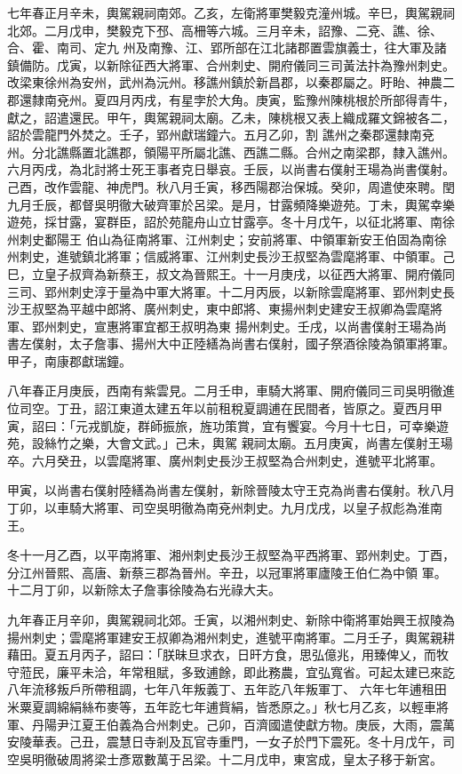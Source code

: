 \begin{pinyinscope}
 七年春正月辛未，輿駕親祠南郊。乙亥，左衛將軍樊毅克潼州城。辛巳，輿駕親祠北郊。二月戊申，樊毅克下邳、高柵等六城。三月辛未，詔豫、二兗、譙、徐、合、霍、南司、定九
 州及南豫、江、郢所部在江北諸郡置雲旗義士，往大軍及諸鎮備防。戊寅，以新除征西大將軍、合州刺史、開府儀同三司黃法抃為豫州刺史。改梁東徐州為安州，武州為沅州。移譙州鎮於新昌郡，以秦郡屬之。盱眙、神農二郡還隸南兗州。夏四月丙戌，有星孛於大角。庚寅，監豫州陳桃根於所部得青牛，獻之，詔遣還民。甲午，輿駕親祠太廟。乙未，陳桃根又表上織成羅文錦被各二，詔於雲龍門外焚之。壬子，郢州獻瑞鐘六。五月乙卯，割
 譙州之秦郡還隸南兗州。分北譙縣置北譙郡，領陽平所屬北譙、西譙二縣。合州之南梁郡，隸入譙州。六月丙戌，為北討將士死王事者克日舉哀。壬辰，以尚書右僕射王瑒為尚書僕射。己酉，改作雲龍、神虎門。秋八月壬寅，移西陽郡治保城。癸卯，周遣使來聘。閏九月壬辰，都督吳明徹大破齊軍於呂梁。是月，甘露頻降樂遊苑。丁未，輿駕幸樂遊苑，採甘露，宴群臣，詔於苑龍舟山立甘露亭。冬十月戊午，以征北將軍、南徐州刺史鄱陽王
 伯山為征南將軍、江州刺史；安前將軍、中領軍新安王伯固為南徐州刺史，進號鎮北將軍；信威將軍、江州刺史長沙王叔堅為雲麾將軍、中領軍。己巳，立皇子叔齊為新蔡王，叔文為晉熙王。十一月庚戌，以征西大將軍、開府儀同三司、郢州刺史淳于量為中軍大將軍。十二月丙辰，以新除雲麾將軍、郢州刺史長沙王叔堅為平越中郎將、廣州刺史，東中郎將、東揚州刺史建安王叔卿為雲麾將軍、郢州刺史，宣惠將軍宜都王叔明為東
 揚州刺史。壬戌，以尚書僕射王瑒為尚書左僕射，太子詹事、揚州大中正陸繕為尚書右僕射，國子祭酒徐陵為領軍將軍。甲子，南康郡獻瑞鐘。



 八年春正月庚辰，西南有紫雲見。二月壬申，車騎大將軍、開府儀同三司吳明徹進位司空。丁丑，詔江東道太建五年以前租稅夏調逋在民間者，皆原之。夏西月甲寅，詔曰：「元戎凱旋，群師振旅，旌功策賞，宜有饗宴。今月十七日，可幸樂遊苑，設絲竹之樂，大會文武。」己未，輿駕
 親祠太廟。五月庚寅，尚書左僕射王瑒卒。六月癸丑，以雲麾將軍、廣州刺史長沙王叔堅為合州刺史，進號平北將軍。



 甲寅，以尚書右僕射陸繕為尚書左僕射，新除晉陵太守王克為尚書右僕射。秋八月丁卯，以車騎大將軍、司空吳明徹為南兗州刺史。九月戊戌，以皇子叔彪為淮南王。



 冬十一月乙酉，以平南將軍、湘州刺史長沙王叔堅為平西將軍、郢州刺史。丁酉，分江州晉熙、高唐、新蔡三郡為晉州。辛丑，以冠軍將軍廬陵王伯仁為中領
 軍。十二月丁卯，以新除太子詹事徐陵為右光祿大夫。



 九年春正月辛卯，輿駕親祠北郊。壬寅，以湘州刺史、新除中衛將軍始興王叔陵為揚州刺史；雲麾將軍建安王叔卿為湘州刺史，進號平南將軍。二月壬子，輿駕親耕藉田。夏五月丙子，詔曰：「朕昧旦求衣，日旰方食，思弘億兆，用臻俾乂，而牧守蒞民，廉平未洽，年常租賦，多致逋餘，即此務農，宜弘寬省。可起太建已來訖八年流移叛戶所帶租調，七年八年叛義丁、五年訖八年叛軍丁、
 六年七年逋租田米粟夏調綿絹絲布麥等，五年訖七年逋貲絹，皆悉原之。」秋七月乙亥，以輕車將軍、丹陽尹江夏王伯義為合州刺史。己卯，百濟國遣使獻方物。庚辰，大雨，震萬安陵華表。己丑，震慧日寺剎及瓦官寺重門，一女子於門下震死。冬十月戊午，司空吳明徹破周將梁士彥眾數萬于呂梁。十二月戊申，東宮成，皇太子移于新宮。




\end{pinyinscope}

